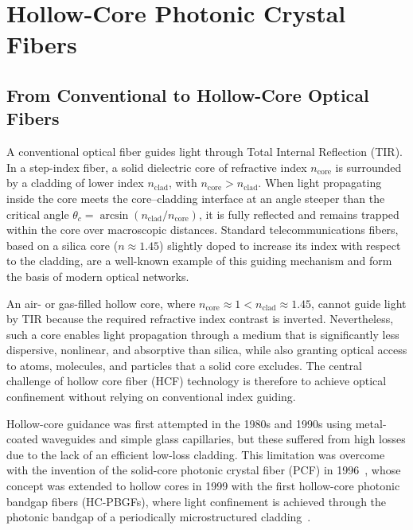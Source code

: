 \section{Hollow-Core Photonic Crystal Fibers}

\subsection[From Conventional to Hollow-Core Optical Fibers]{From Conventional to Hollow-Core Optical \\ Fibers}

A conventional optical fiber guides light through Total Internal Reflection (TIR). In a step-index fiber, a solid dielectric core of refractive index $n_{\text{core}}$ is surrounded by a cladding of lower index $n_{\text{clad}}$, with $n_{\text{core}} > n_{\text{clad}}$. When light propagating inside the core meets the core--cladding interface at an angle steeper than the critical angle $\theta_c = \arcsin(n_{\text{clad}}/n_{\text{core}})$, it is fully reflected and remains trapped within the core over macroscopic distances. Standard telecommunications fibers, based on a silica core ($n \approx 1.45$) slightly doped to increase its index with respect to the cladding, are a well-known example of this guiding mechanism and form the basis of modern optical networks.

An air- or gas-filled hollow core, where $n_{\text{core}} \approx 1 < n_{\text{clad}} \approx 1.45$, cannot guide light by TIR because the required refractive index contrast is inverted. Nevertheless, such a core enables light propagation through a medium that is significantly less dispersive, nonlinear, and absorptive than silica, while also granting optical access to atoms, molecules, and particles that a solid core excludes. The central challenge of hollow core fiber (HCF) technology is therefore to achieve optical confinement without relying on conventional index guiding.

Hollow-core guidance was first attempted in the 1980s and 1990s using metal-coated waveguides and simple glass capillaries, but these suffered from high losses due to the lack of an efficient low-loss cladding. This limitation was overcome with the invention of the solid-core photonic crystal fiber (PCF) in 1996~\cite{Knight:96}, whose concept was extended to hollow cores in 1999 with the first hollow-core photonic bandgap fibers (HC-PBGFs), where light confinement is achieved through the photonic bandgap of a periodically microstructured cladding~\cite{Komanec:20}.

